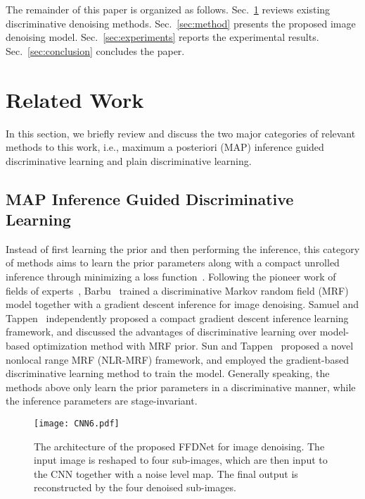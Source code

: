 \documentclass[journal]{IEEEtran}
\begin{document}
The remainder of this paper is organized as follows.
Sec.~\ref{sec:related_work} reviews existing discriminative denoising methods.
Sec.~\ref{sec:method} presents the proposed image denoising model.
Sec.~\ref{sec:experiments} reports the experimental results.
Sec.~\ref{sec:conclusion} concludes the paper.


\section{Related Work}
\label{sec:related_work}

In this section, we briefly review and discuss the two major categories of relevant methods to this work, i.e., maximum a posteriori (MAP) inference guided discriminative learning and plain discriminative learning.



\vspace{-0.2cm}
\subsection{MAP Inference Guided Discriminative Learning}
Instead of first learning the prior and then performing the inference, this category of methods aims to learn the prior parameters along with a compact unrolled inference through minimizing a loss function~\cite{barbu2009training}.
Following the pioneer work of fields of experts~\cite{roth2005fields}, Barbu~\cite{barbu2009training} trained a discriminative Markov random field (MRF) model together with a gradient descent inference for image denoising. Samuel and Tappen~\cite{samuel2009learning} independently proposed a compact gradient descent inference learning framework, and discussed the advantages of discriminative learning over model-based optimization method with MRF prior. Sun and Tappen~\cite{sun2011learning} proposed a novel nonlocal range MRF (NLR-MRF) framework, and employed the gradient-based discriminative learning method to train the model. Generally speaking, the methods above only learn the prior parameters in a discriminative manner, while the inference parameters are stage-invariant.


\begin{figure*}[htbp]
  \centering
\texttt{[image: CNN6.pdf]}\\
  \caption{The architecture of the proposed FFDNet for image denoising. The input image is reshaped to four sub-images, which are then input to the CNN together with a noise level map. The final output is reconstructed by the four denoised sub-images.}
  \label{fig1}\vspace{-0.1cm}
\end{figure*}
\end{document}

